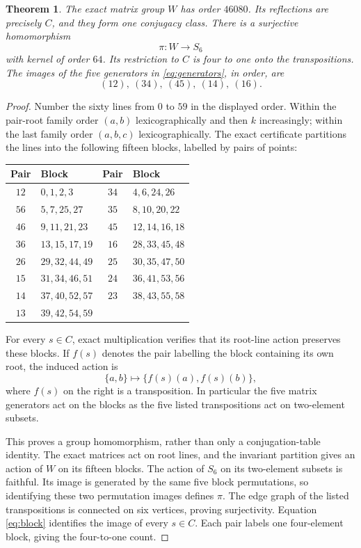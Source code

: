 \documentclass[11pt]{article}
\newtheorem{theorem}{Theorem}
\begin{document}
\begin{theorem}\label{thm:quotient}
The exact matrix group $W$ has order $46080$. Its reflections are
precisely $C$, and they form one conjugacy class. There is a
surjective homomorphism
\[
                    \pi:W\longrightarrow S_6
\]
with kernel of order $64$. Its restriction to $C$ is four to one onto
the transpositions. The images of the five generators in
\eqref{eq:generators}, in order, are
\[
                    (12),\ (34),\ (45),\ (14),\ (16).
\]
\end{theorem}
\begin{proof}
Number the sixty lines from $0$ to $59$ in the displayed order.
Within the pair-root family order $(a,b)$ lexicographically and then
$k$ increasingly; within the last family order $(a,b,c)$
lexicographically. The exact certificate partitions the lines into
the following fifteen blocks, labelled by pairs of points:
\begin{center}\small
\begin{tabular}{cl@{\qquad}cl}
\toprule
Pair&Block&Pair&Block\\
\midrule
$12$&$0,1,2,3$&$34$&$4,6,24,26$\\
$56$&$5,7,25,27$&$35$&$8,10,20,22$\\
$46$&$9,11,21,23$&$45$&$12,14,16,18$\\
$36$&$13,15,17,19$&$16$&$28,33,45,48$\\
$26$&$29,32,44,49$&$25$&$30,35,47,50$\\
$15$&$31,34,46,51$&$24$&$36,41,53,56$\\
$14$&$37,40,52,57$&$23$&$38,43,55,58$\\
$13$&$39,42,54,59$&&\\
\bottomrule
\end{tabular}
\end{center}
For every $s\in C$, exact multiplication verifies that its root-line
action preserves these blocks. If $f(s)$ denotes the pair labelling
the block containing its own root, the induced action is
\begin{equation}\label{eq:block}
              \{a,b\}\longmapsto\{f(s)(a),f(s)(b)\},
\end{equation}
where $f(s)$ on the right is a transposition. In particular the five
matrix generators act on the blocks as the five listed
transpositions act on two-element subsets.

This proves a group homomorphism, rather than only a conjugation-table
identity. The exact matrices act on root lines, and the invariant
partition gives an action of $W$ on its fifteen blocks. The action
of $S_6$ on its two-element subsets is faithful. Its image is generated
by the same five block permutations, so identifying these two
permutation images defines $\pi$. The edge graph of the listed
transpositions is connected on six vertices, proving surjectivity.
Equation \eqref{eq:block} identifies the image of every $s\in C$.
Each pair labels one four-element block, giving the four-to-one count.


\end{proof}
\end{document}

